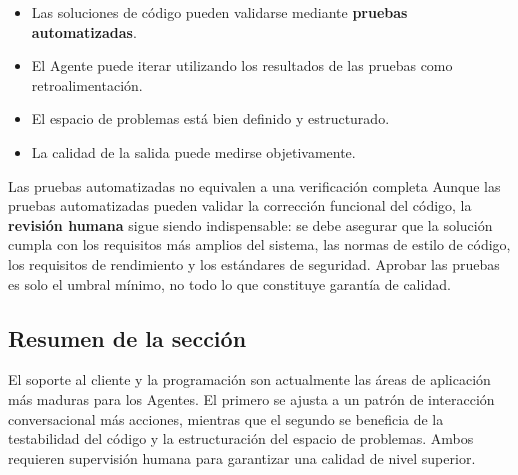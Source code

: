 \begin{itemize}
    \item Las soluciones de código pueden validarse mediante \textbf{pruebas automatizadas}.
    \item El Agente puede iterar utilizando los resultados de las pruebas como retroalimentación.
    \item El espacio de problemas está bien definido y estructurado.
    \item La calidad de la salida puede medirse objetivamente.
\end{itemize}

\begin{warningbox}{Las pruebas automatizadas no equivalen a una verificación completa}
Aunque las pruebas automatizadas pueden validar la corrección funcional del código, la \textbf{revisión humana} sigue siendo indispensable: se debe asegurar que la solución cumpla con los requisitos más amplios del sistema, las normas de estilo de código, los requisitos de rendimiento y los estándares de seguridad. Aprobar las pruebas es solo el umbral mínimo, no todo lo que constituye garantía de calidad.
\end{warningbox}

\subsection{Resumen de la sección}
El soporte al cliente y la programación son actualmente las áreas de aplicación más maduras para los Agentes. El primero se ajusta a un patrón de interacción conversacional más acciones, mientras que el segundo se beneficia de la testabilidad del código y la estructuración del espacio de problemas. Ambos requieren supervisión humana para garantizar una calidad de nivel superior.
